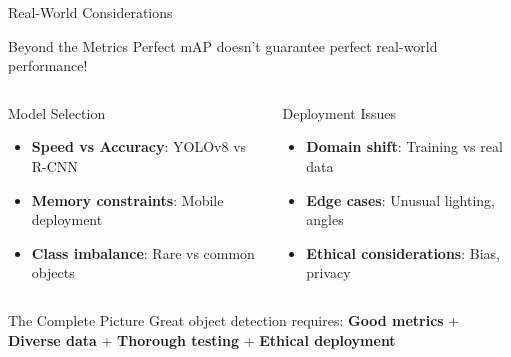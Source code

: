 \documentclass[usenames,dvipsnames]{beamer}
\begin{document}
	\begin{frame}{Real-World Considerations}
		\begin{alertbox}{Beyond the Metrics}
		Perfect mAP doesn't guarantee perfect real-world performance!
		\end{alertbox}
		
		\begin{columns}
		\begin{column}{0.48\textwidth}
			\begin{examplebox}{Model Selection}
			\begin{itemize}
				\item \textbf{Speed vs Accuracy}: YOLOv8 vs R-CNN
				\item \textbf{Memory constraints}: Mobile deployment
				\item \textbf{Class imbalance}: Rare vs common objects
			\end{itemize}
			\end{examplebox}
		\end{column}
		
		\begin{column}{0.48\textwidth}
			\begin{definitionbox}{Deployment Issues}
			\begin{itemize}
				\item \textbf{Domain shift}: Training vs real data
				\item \textbf{Edge cases}: Unusual lighting, angles
				\item \textbf{Ethical considerations}: Bias, privacy
			\end{itemize}
			\end{definitionbox}
		\end{column}
		\end{columns}
		
		\vspace{0.3cm}
		\begin{theorembox}{The Complete Picture}
		Great object detection requires: \textbf{Good metrics} + \textbf{Diverse data} + \textbf{Thorough testing} + \textbf{Ethical deployment}
		\end{theorembox}
	\end{frame}
	
\end{document}
